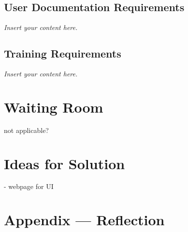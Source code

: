 \documentclass[12pt]{article}
\newcommand{\lips}{\textit{Insert your content here.}}
\begin{document}
\subsection{User Documentation Requirements}
\lips
\subsection{Training Requirements}
\lips

\section{Waiting Room}

not applicable?

\section{Ideas for Solution}

- webpage for UI

\newpage{}
\section*{Appendix --- Reflection}




\end{document}
